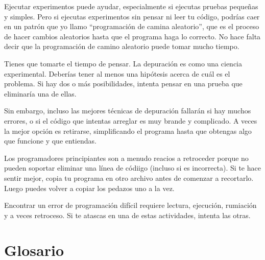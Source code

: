 \documentclass[10pt]{book}
\begin{document}
Ejecutar experimentos puede ayudar, especialmente si ejecutas pruebas
pequeñas y simples.  Pero si ejecutas experimentos sin pensar ni leer tu
código, podrías caer en un patrón que yo llamo ``programación de camina aleatorio'',
que es el proceso de hacer cambios aleatorios hasta que el programa
haga lo correcto.  No hace falta decir que la programación de camino aleatorio
puede tomar mucho tiempo.

Tienes que tomarte el tiempo de pensar.  La depuración es como una
ciencia experimental.  Deberías tener al menos una hipótesis acerca de
cuál es el problema.  Si hay dos o más posibilidades, intenta
pensar en una prueba que eliminaría una de ellas.

Sin embargo, incluso las mejores técnicas de depuración fallarán si hay muchos
errores, o si el código que intentas arreglar es muy brande y
complicado.  A veces la mejor opción es retirarse, simplificando el
programa hasta que obtengas algo que funcione y que
entiendas.

Los programadores principiantes son a menudo reacios a retroceder porque
no pueden soportar eliminar una línea de códiigo (incluso si es incorrecta).
Si te hace sentir mejor, copia tu programa en otro archivo
antes de comenzar a recortarlo.  Luego puedes volver a copiar los
pedazos uno a la vez.

Encontrar un error de programación difícil requiere lectura, ejecución, rumiación y
a veces retroceso.  Si te atascas en una de estas actividades,
intenta las otras.


\section{Glosario}
\end{document}
